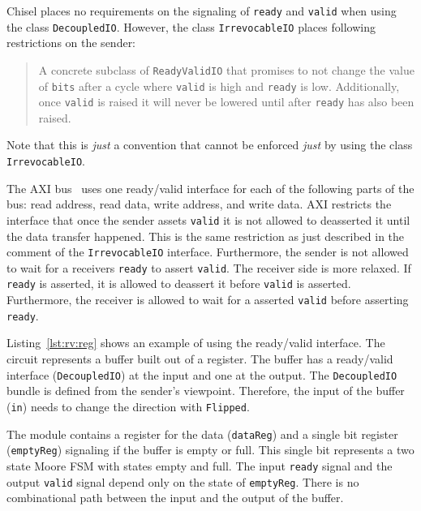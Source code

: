 \documentclass[%
    10pt,
    headinclude, footexclude,
    openright, %
    notitlepage,
    cleardoubleempty,
    headsepline,
    pointlessnumbers,
    bibtotoc, idxtotoc,
    ]{scrbook}
\newcommand{\code}[1]{{\small{\texttt{#1}}}}
\begin{document}
Chisel places no requirements on the signaling of \code{ready} and \code{valid}
when using the class \code{DecoupledIO}.
However, the class \code{IrrevocableIO} places following restrictions
on the sender:

\begin{quote}
A concrete subclass of \code{ReadyValidIO} that promises to not change
the value of \code{bits} after a cycle where \code{valid} is high and \code{ready} is low.
Additionally, once \code{valid} is raised it will never be lowered until after
\code{ready} has also been raised.
\end{quote}

\noindent Note that this is \emph{just} a convention that cannot be enforced \emph{just}
by using the class \code{IrrevocableIO}.

The AXI  bus~\cite{axi4standard} uses one ready/valid interface for each of the following parts of the bus:
read address, read data, write address, and write data. AXI restricts the interface
that once the sender assets \code{valid} it is not allowed to deasserted it
until the data transfer happened. This is the same restriction as just described
in the comment of the \code{IrrevocableIO} interface.
Furthermore, the sender is not allowed to wait for a receivers
\code{ready} to assert \code{valid}.
The receiver side is more relaxed. If \code{ready} is asserted, it is allowed to deassert it
before \code{valid} is asserted. Furthermore, the receiver is allowed to wait for a asserted
\code{valid} before asserting \code{ready}.


Listing~\ref{lst:rv:reg} shows an example of using the ready/valid interface.
The circuit represents a buffer built out of a register.
The buffer has a ready/valid interface (\code{DecoupledIO}) at the input and one at the output.
The \code{DecoupledIO} bundle is defined from the sender's viewpoint. Therefore,
the input of the buffer (\code{in}) needs to change the direction with \code{Flipped}.

The module contains a register for the data (\code{dataReg}) and a single bit
register (\code{emptyReg}) signaling if the buffer is empty or full.
This single bit represents a two state Moore FSM with states empty and full.
The input \code{ready} signal and the output \code{valid} signal depend only
on the state of \code{emptyReg}. There is no combinational path between the
input and the output of the buffer.
\end{document}
